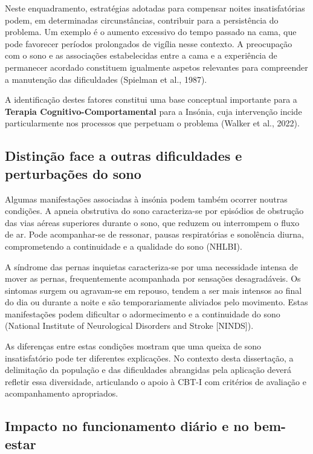 Neste enquadramento, estratégias adotadas para compensar noites insatisfatórias podem, em determinadas circunstâncias, contribuir para a persistência do problema. Um exemplo é o aumento excessivo do tempo passado na cama, que pode favorecer períodos prolongados de vigília nesse contexto. A preocupação com o sono e as associações estabelecidas entre a cama e a experiência de permanecer acordado constituem igualmente aspetos relevantes para compreender a manutenção das dificuldades (Spielman et al., 1987).

A identificação destes fatores constitui uma base conceptual importante para a \textbf{Terapia Cognitivo-Comportamental} para a Insónia, cuja intervenção incide particularmente nos processos que perpetuam o problema (Walker et al., 2022).


\subsection{Distinção face a outras dificuldades e perturbações do sono}
\label{sec:chap2_outrasDificuladades}

Algumas manifestações associadas à insónia podem também ocorrer noutras condições. A apneia obstrutiva do sono caracteriza-se por episódios de obstrução das vias aéreas superiores durante o sono, que reduzem ou interrompem o fluxo de ar. Pode acompanhar-se de ressonar, pausas respiratórias e sonolência diurna, comprometendo a continuidade e a qualidade do sono (NHLBI).

A síndrome das pernas inquietas caracteriza-se por uma necessidade intensa de mover as pernas, frequentemente acompanhada por sensações desagradáveis. Os sintomas surgem ou agravam-se em repouso, tendem a ser mais intensos ao final do dia ou durante a noite e são temporariamente aliviados pelo movimento. Estas manifestações podem dificultar o adormecimento e a continuidade do sono (National Institute of Neurological Disorders and Stroke [NINDS]).

As diferenças entre estas condições mostram que uma queixa de sono insatisfatório pode ter diferentes explicações. No contexto desta dissertação, a delimitação da população e das dificuldades abrangidas pela aplicação deverá refletir essa diversidade, articulando o apoio à CBT-I com critérios de avaliação e acompanhamento apropriados.

\subsection{Impacto no funcionamento diário e no bem-estar}
\label{sec:chap2_impacto}

